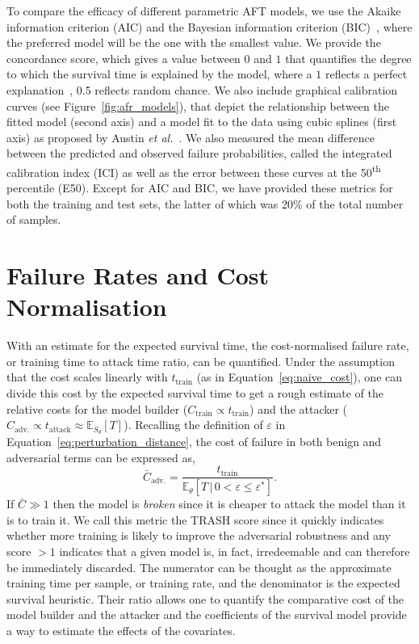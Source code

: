 To compare the efficacy of different parametric AFT models, we use the Akaike information criterion (AIC) and the Bayesian information criterion (BIC)~\cite{stoica2004model,taddy2019business}, where the preferred model will be the one with the smallest value. We provide the
concordance score, which gives a value between $0$ and $1$ that quantifies the degree to which the survival time is explained by the model, where a $1$ reflects a perfect explanation~\cite{kleinbaum1996survival}, 0.5 reflects random chance. We also include graphical calibration curves (see Figure~\ref{fig:afr_models}), that depict the relationship between the fitted model (second axis) and a model fit to the data using cubic splines (first axis) as proposed by Austin \textit{et al.}~\cite{ici}. We also measured the mean difference between the predicted and observed failure probabilities,  called the integrated calibration index (ICI) as well as the error between these curves at the 50\textsuperscript{th} percentile (E50). Except for AIC and BIC, we have provided these metrics for both the training and test sets, the latter of which was 20\% of the total number of samples.

\section{Failure Rates and Cost Normalisation}
\label{cost_normalization}

With an estimate for the expected survival time, the cost-normalised failure rate, or training time to attack time ratio, can be quantified. Under the assumption that the cost scales linearly with $t_{\mathrm{train}}$ (as in Equation~\ref{eq:naive_cost}), one can divide this cost by the expected survival time to get a rough estimate of the relative costs for the model builder ($C_{\mathrm{train}} \propto t_{\mathrm{train}}$) and the attacker ($C_{\mathrm{adv.}} \propto t_{\mathrm{attack}} \approx \mathbb{E}_{S_\theta}[T]$). Recalling the definition of $\varepsilon$ in Equation~\ref{eq:perturbation_distance}, the cost of failure in both benign and adversarial terms can be expressed as,
\begin{equation}
	\bar{C}_{\mathrm{adv.}}=\frac{t_{\mathrm{train}}}{\mathbb{E}_{\theta}[T \,|\, 0 < \varepsilon \leq \varepsilon^*]}.
	\label{eq:cost}
\end{equation}
If $\bar{C} \gg 1$  then the model is \textit{broken} since it is cheaper to attack the model than it is to train it.
We call this metric the TRASH score since it quickly indicates whether more training is likely to improve the adversarial robustness and any score $ > 1$ indicates that a given model is, in fact, irredeemable and can therefore be immediately discarded. The numerator can be thought as the approximate training time per sample, or training rate, and the denominator is the expected survival heuristic. Their ratio allows one to quantify the comparative cost of the model builder and the attacker and the coefficients of the survival model provide a way to estimate the effects of the covariates.


